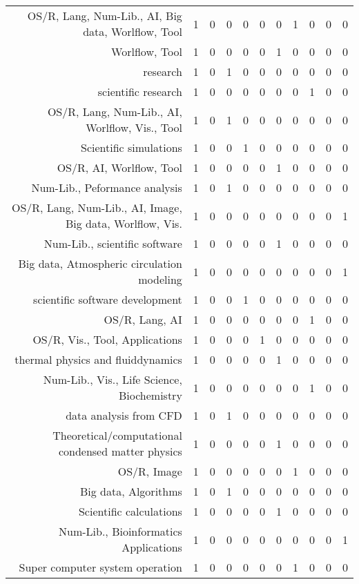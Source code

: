 {\begin{landscape}
\begin{longtable}[htb]{r|c|c|c|c|c|c|c|c|c|c}
{OS/R, Lang, Num-Lib., AI, Big data, Worlflow, Tool} & 1 & 0 & 0 & 0 & 0 & 0 & 1 & 0 & 0 & 0 \\%
{Worlflow, Tool} & 1 & 0 & 0 & 0 & 0 & 1 & 0 & 0 & 0 & 0 \\%
{research} & 1 & 0 & 1 & 0 & 0 & 0 & 0 & 0 & 0 & 0 \\%
{scientific research} & 1 & 0 & 0 & 0 & 0 & 0 & 0 & 1 & 0 & 0 \\%
{OS/R, Lang, Num-Lib., AI, Worlflow, Vis., Tool} & 1 & 0 & 1 & 0 & 0 & 0 & 0 & 0 & 0 & 0 \\%
{Scientific simulations} & 1 & 0 & 0 & 1 & 0 & 0 & 0 & 0 & 0 & 0 \\%
{OS/R, AI, Worlflow, Tool} & 1 & 0 & 0 & 0 & 0 & 1 & 0 & 0 & 0 & 0 \\%
{Num-Lib., Peformance analysis} & 1 & 0 & 1 & 0 & 0 & 0 & 0 & 0 & 0 & 0 \\%
{OS/R, Lang, Num-Lib., AI, Image, Big data, Worlflow, Vis.} & 1 & 0 & 0 & 0 & 0 & 0 & 0 & 0 & 0 & 1 \\%
{Num-Lib., scientific software} & 1 & 0 & 0 & 0 & 0 & 1 & 0 & 0 & 0 & 0 \\%
{Big data, Atmospheric circulation modeling} & 1 & 0 & 0 & 0 & 0 & 0 & 0 & 0 & 0 & 1 \\%
{scientific software development} & 1 & 0 & 0 & 1 & 0 & 0 & 0 & 0 & 0 & 0 \\%
{OS/R, Lang, AI} & 1 & 0 & 0 & 0 & 0 & 0 & 0 & 1 & 0 & 0 \\%
{OS/R, Vis., Tool, Applications} & 1 & 0 & 0 & 0 & 1 & 0 & 0 & 0 & 0 & 0 \\%
{thermal physics and fluiddynamics} & 1 & 0 & 0 & 0 & 0 & 1 & 0 & 0 & 0 & 0 \\%
{Num-Lib., Vis., Life Science, Biochemistry} & 1 & 0 & 0 & 0 & 0 & 0 & 0 & 1 & 0 & 0 \\%
{data analysis from CFD} & 1 & 0 & 1 & 0 & 0 & 0 & 0 & 0 & 0 & 0 \\%
{Theoretical/computational condensed matter physics} & 1 & 0 & 0 & 0 & 0 & 1 & 0 & 0 & 0 & 0 \\%
{OS/R, Image} & 1 & 0 & 0 & 0 & 0 & 0 & 1 & 0 & 0 & 0 \\%
{Big data, Algorithms} & 1 & 0 & 1 & 0 & 0 & 0 & 0 & 0 & 0 & 0 \\%
{Scientific calculations} & 1 & 0 & 0 & 0 & 0 & 1 & 0 & 0 & 0 & 0 \\%
{Num-Lib., Bioinformatics Applications} & 1 & 0 & 0 & 0 & 0 & 0 & 0 & 0 & 0 & 1 \\%
{Super computer system operation} & 1 & 0 & 0 & 0 & 0 & 0 & 1 & 0 & 0 & 0 \\%

\end{longtable}
\end{landscape}}
